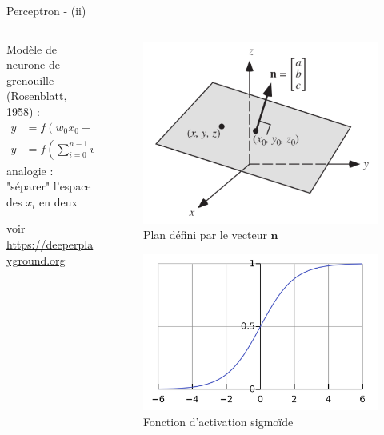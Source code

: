 \documentclass[9pt, aspectratio=169]{beamer}
\begin{document}
\begin{frame}{Perceptron - (ii)} %

\begin{columns}
    \begin{column}{0.6\textwidth}
Modèle de neurone de grenouille (Rosenblatt, 1958) :
\begin{align*}
	y &= f(w_0 x_0 + ... + w_{n-1} x_{n-1} + b) \\
	y &= f\left( \sum\limits_{i=0}^{n-1}	 w_i x_i + b\right)
\end{align*}
analogie : "séparer" l'espace des $x_i$ en deux

\vspace{1cm}
voir \url{https://deeperplayground.org}

    \end{column}
    \begin{column}{0.38\textwidth}
		\begin{figure}
		\includegraphics[width=.7\linewidth]{fig/plan.png}
		\caption{Plan défini par le vecteur $\textbf{n}$}
		\end{figure}
		\begin{figure}
		\includegraphics[width=.7\linewidth]{fig/sigmoid.png}
		\caption{Fonction d'activation sigmoïde}
		\end{figure}
    \end{column}
\end{columns}

\end{frame}
\end{document}
